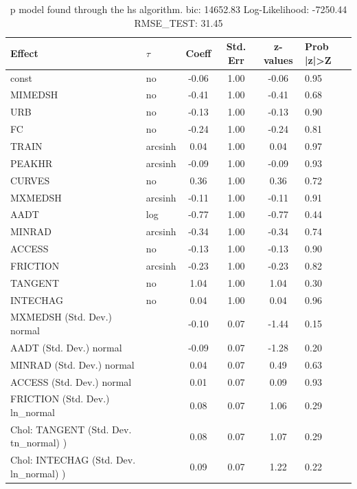 \begin{table}
	\caption{p model found through the hs algorithm. bic: 14652.83 Log-Likelihood: -7250.44 RMSE_TEST: 31.45}
	\begin{center}
		\begin{tabular}{|l|l|c|c|c|l|}
			\hline
			Effect & $\tau$ & Coeff & Std. Err & z-values & Prob |z|>Z \\
			\hline
			const & no & -0.06 & 1.00 & -0.06 & 0.95 \\
			\hline
			MIMEDSH & no & -0.41 & 1.00 & -0.41 & 0.68 \\
			\hline
			URB & no & -0.13 & 1.00 & -0.13 & 0.90 \\
			\hline
			FC & no & -0.24 & 1.00 & -0.24 & 0.81 \\
			\hline
			TRAIN & arcsinh & 0.04 & 1.00 & 0.04 & 0.97 \\
			\hline
			PEAKHR & arcsinh & -0.09 & 1.00 & -0.09 & 0.93 \\
			\hline
			CURVES & no & 0.36 & 1.00 & 0.36 & 0.72 \\
			\hline
			MXMEDSH & arcsinh & -0.11 & 1.00 & -0.11 & 0.91 \\
			\hline
			AADT & log & -0.77 & 1.00 & -0.77 & 0.44 \\
			\hline
			MINRAD & arcsinh & -0.34 & 1.00 & -0.34 & 0.74 \\
			\hline
			ACCESS & no & -0.13 & 1.00 & -0.13 & 0.90 \\
			\hline
			FRICTION & arcsinh & -0.23 & 1.00 & -0.23 & 0.82 \\
			\hline
			TANGENT & no & 1.04 & 1.00 & 1.04 & 0.30 \\
			\hline
			INTECHAG & no & 0.04 & 1.00 & 0.04 & 0.96 \\
			\hline
			MXMEDSH (Std. Dev.) normal &  & -0.10 & 0.07 & -1.44 & 0.15 \\
			\hline
			AADT (Std. Dev.) normal &  & -0.09 & 0.07 & -1.28 & 0.20 \\
			\hline
			MINRAD (Std. Dev.) normal &  & 0.04 & 0.07 & 0.49 & 0.63 \\
			\hline
			ACCESS (Std. Dev.) normal &  & 0.01 & 0.07 & 0.09 & 0.93 \\
			\hline
			FRICTION (Std. Dev.) ln_normal &  & 0.08 & 0.07 & 1.06 & 0.29 \\
			\hline
			 Chol: TANGENT (Std. Dev. tn_normal) ) &  & 0.08 & 0.07 & 1.07 & 0.29 \\
			\hline
			 Chol: INTECHAG (Std. Dev. ln_normal) ) &  & 0.09 & 0.07 & 1.22 & 0.22 \\

\end{tabular}
\end{center}
\end{table}
